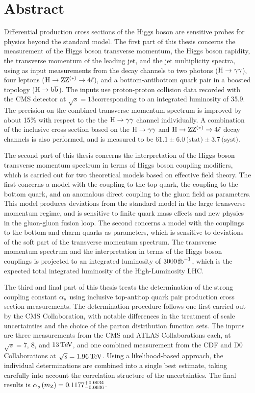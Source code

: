 \section*{Abstract}

Differential production cross sections of the Higgs boson are sensitive probes for physics beyond the standard model.
% 
The first part of this thesis concerns the measurement of the Higgs boson transverse momentum, the Higgs boson rapidity, the transverse momentum of the leading jet, and the jet multiplicity spectra, using as input measurements from the decay channels to two photons ($\mathrm{H}\to\mathrm{\gamma}\mathrm{\gamma}$), four leptons ($\mathrm{H}\to\mathrm{Z}\mathrm{Z}^{(\ast)}\to 4\ell$), and a bottom-antibottom quark pair in a boosted topology ($\mathrm{H}\to\mathrm{b}\overline{\mathrm{b}}$).
% 
The inputs use proton-proton collision data recorded with the CMS detector at $\sqrt{s}=13$\TeV corresponding to an integrated luminosity of 35.9\fbinv.
% 
The precision on the combined transverse momentum spectrum is improved by about 15\% with respect to the the $\mathrm{H}\to\mathrm{\gamma}\mathrm{\gamma}$ channel individually.
% 
A combination of the inclusive cross section based on the $\mathrm{H}\to\mathrm{\gamma}\mathrm{\gamma}$ and $\mathrm{H}\to\mathrm{Z}\mathrm{Z}^{(\ast)}\to 4\ell$ decay channels is also performed, and is measured to be $61.1   \pm 6.0 \,\text{(stat)} \pm 3.7 \,\text{(syst)}$\pb.


The second part of this thesis concerns the interpretation of the Higgs boson transverse momentum spectrum in terms of Higgs boson coupling modifiers, which is carried out for two theoretical models based on effective field theory.
% 
The first concerns a model with the coupling to the top quark, the coupling to the bottom quark, and an anomalous direct coupling to the gluon field as parameters.
% 
This model produces deviations from the standard model in the large transverse momentum regime, and is sensitive to finite quark mass effects and new physics in the gluon-gluon fusion loop.
% 
The second concerns a model with the couplings to the bottom and charm quarks as parameters, which is sensitive to deviations of the soft part of the transverse momentum spectrum.
% 
The transverse momentum spectrum and the interpretation in terms of the Higgs boson couplings is projected to an integrated luminosity of $3000\,\text{fb}^{-1}$, which is the expected total integrated luminosity of the High-Luminosity LHC.


The third and final part of this thesis treats the determination of the strong coupling constant $\alpha_s$ using inclusive top-antitop quark pair production cross section measurements.
% 
The determination procedure follows one first carried out by the CMS Collaboration, with notable differences in the treatment of scale uncertainties and the choice of the parton distribution function sets.
% 
The inputs are three measurements from the CMS and ATLAS Collaborations each, at $\sqrt{s}=7$, $8$, and $13\,\text{TeV}$, and one combined measurement from the CDF and D0 Collaborations at $\sqrt{s}=1.96\,\text{TeV}$.
% 
Using a likelihood-based approach, the individual determinations are combined into a single best estimate, taking carefully into account the correlation structure of the uncertainties.
% 
The final results is $\alpha_s \left( m_\mathrm{Z} \right)  = 0.1177^{+0.0034}_{-0.0036}$.



